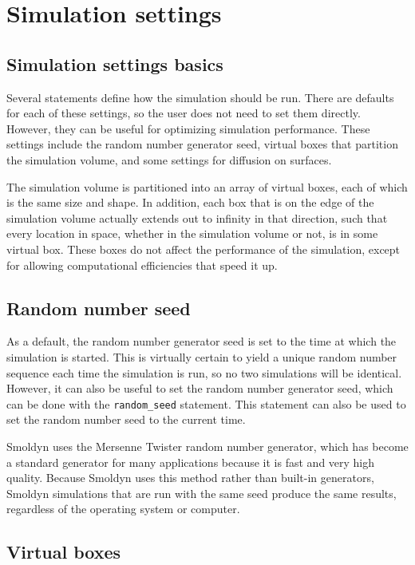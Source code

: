 \documentclass {book}
\newcommand {\ttt} {\texttt}
\begin{document}
\chapter{Simulation settings}

\section{Simulation settings basics}

Several statements define how the simulation should be run. There are defaults for each of these settings, so the user does not need to set them directly. However, they can be useful for optimizing simulation performance. These settings include the random number generator seed, virtual boxes that partition the simulation volume, and some settings for diffusion on surfaces.

The simulation volume is partitioned into an array of virtual boxes, each of which is the same size and shape. In addition, each box that is on the edge of the simulation volume actually extends out to infinity in that direction, such that every location in space, whether in the simulation volume or not, is in some virtual box. These boxes do not affect the performance of the simulation, except for allowing computational efficiencies that speed it up.

\section{Random number seed}

As a default, the random number generator seed is set to the time at which the simulation is started. This is virtually certain to yield a unique random number sequence each time the simulation is run, so no two simulations will be identical. However, it can also be useful to set the random number generator seed, which can be done with the \ttt{random\_seed} statement. This statement can also be used to set the random number seed to the current time.

Smoldyn uses the Mersenne Twister random number generator, which has become a standard generator for many applications because it is fast and very high quality. Because Smoldyn uses this method rather than built-in generators, Smoldyn simulations that are run with the same seed produce the same results, regardless of the operating system or computer.

\section{Virtual boxes}
\end{document}
